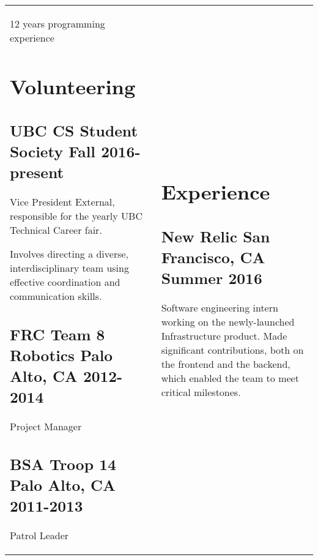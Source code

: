 \documentclass[letterpaper]{article}
\newlength{\leftcol}
\newlength{\rightcol}
\newcommand{\subtitle}{\normalfont\sffamily\color{black}\large}
\begin{document}
\begin{tabularx}{\textwidth}{@{}p{\leftcol} p{\rightcol}}
12 years programming experience

\vspace*{4pt}

\section*{Volunteering}

\subsection*{UBC CS Student Society \newline\subtitle Fall 2016-present}

Vice President External, responsible for the yearly UBC Technical Career fair.

\vspace*{.5\baselineskip}

Involves directing a diverse, interdisciplinary team using effective
coordination and communication skills.

\subsection*{FRC Team 8 Robotics \newline\subtitle Palo Alto, CA 2012-2014}

Project Manager

\subsection*{BSA Troop 14 \newline\subtitle Palo Alto, CA 2011-2013}

Patrol Leader

&

\vspace*{2pt}

\section*{Experience}


\subsection*{New Relic \subtitle San Francisco, CA Summer 2016}

Software engineering intern working on the newly-launched Infrastructure
product. Made significant contributions, both on the frontend and the backend,
which enabled the team to meet critical milestones.


\end{tabularx}
\end{document}
